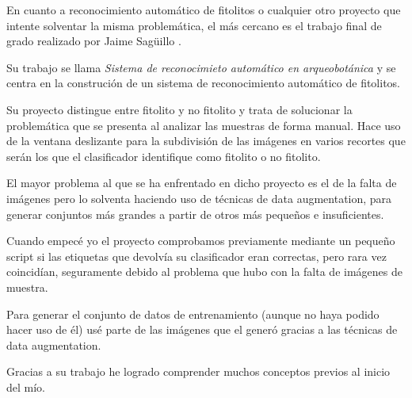 
En cuanto a reconocimiento automático de fitolitos o cualquier otro proyecto que intente solventar la misma problemática, el más cercano es el trabajo final de grado realizado por Jaime Sagüillo \cite{jaime}.

Su trabajo se llama \textit{Sistema de reconocimieto automático en arqueobotánica} y se centra en la construción de un sistema de reconocimiento automático de fitolitos.

Su proyecto distingue entre fitolito y no fitolito  y trata de solucionar la problemática que se presenta al analizar las muestras de forma manual. Hace uso de la ventana deslizante para la subdivisión de las imágenes en varios recortes que serán los que el clasificador identifique como fitolito o no fitolito.

El mayor problema al que se ha enfrentado en dicho proyecto es el de la falta de imágenes pero lo solventa haciendo uso de técnicas de data augmentation, para generar conjuntos más grandes a partir de otros más pequeños e insuficientes.

Cuando empecé yo el proyecto comprobamos previamente mediante un pequeño script si las etiquetas que devolvía su clasificador eran correctas, pero rara vez coincidían, seguramente debido al problema que hubo con la falta de imágenes de muestra.

Para generar el conjunto de datos de entrenamiento (aunque no haya podido hacer uso de él) usé parte de las imágenes que el generó gracias a las técnicas de data augmentation.

Gracias a su trabajo he logrado comprender muchos conceptos previos al inicio del mío.

